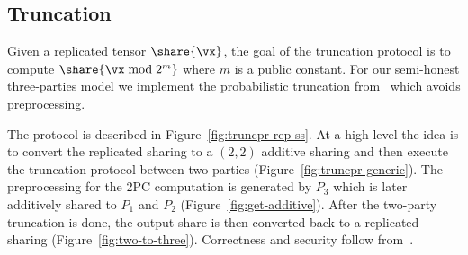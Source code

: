 \subsection{Truncation}
\label{subsec:truncation}

Given a replicated tensor $\share{\vx}$, the goal of the truncation protocol is to compute $\share{\vx \bmod 2^m}$ where $m$ is a public constant.
For our semi-honest three-parties model we implement the probabilistic truncation from~\cite{PoPETS:DalEscKel20} which avoids preprocessing.

The protocol is described in Figure~\ref{fig:truncpr-rep-ss}. At a high-level the idea is to convert the replicated sharing to a $(2,2)$ additive sharing and then execute the truncation protocol between two parties (Figure~\ref{fig:truncpr-generic}). The preprocessing for the 2PC computation is generated by $P_3$ which is later additively shared to $P_1$ and $P_2$ (Figure~\ref{fig:get-additive}). After the two-party truncation is done, the output share is then converted back to a replicated sharing (Figure~\ref{fig:two-to-three}). Correctness and security follow from~\cite{PoPETS:DalEscKel20}.


